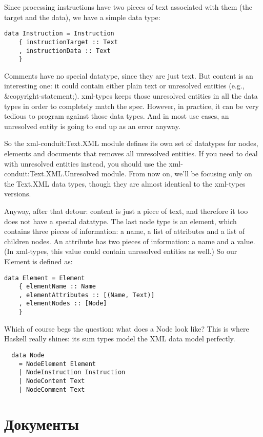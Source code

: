 Since processing instructions have two pieces of text associated with them (the target and the data), we have a simple data type:

\begin{lstlisting}
data Instruction = Instruction
    { instructionTarget :: Text
    , instructionData :: Text
    }
\end{lstlisting}

Comments have no special datatype, since they are just text. But content is an interesting one: it could contain either plain text or unresolved entities (e.g., \&copyright-statement;).  xml-types keeps those unresolved entities in all the data types in order to completely match the spec. However, in practice, it can be very tedious to program against those data types. And in most use cases, an unresolved entity is going to end up as an error anyway.

So the xml-conduit:Text.XML module defines its own set of datatypes for nodes, elements and documents that removes all unresolved entities. If you need to deal with unresolved entities instead, you should use the xml-conduit:Text.XML.Unresolved module. From now on, we'll be focusing only on the Text.XML data types, though they are almost identical to the xml-types versions.

Anyway, after that detour: content is just a piece of text, and therefore it too does not have a special datatype. The last node type is an element, which contains three pieces of information: a name, a list of attributes and a list of children nodes. An attribute has two pieces of information: a name and a value. (In xml-types, this value could contain unresolved entities as well.) So our Element is defined as:

\begin{lstlisting}
data Element = Element
    { elementName :: Name
    , elementAttributes :: [(Name, Text)]
    , elementNodes :: [Node]
    }
\end{lstlisting}

Which of course begs the question: what does a Node look like? This is where Haskell really shines: its sum types model the XML data model perfectly.

\begin{lstlisting}
  data Node
    = NodeElement Element
    | NodeInstruction Instruction
    | NodeContent Text
    | NodeComment Text
\end{lstlisting}

\section{Документы} %
 
